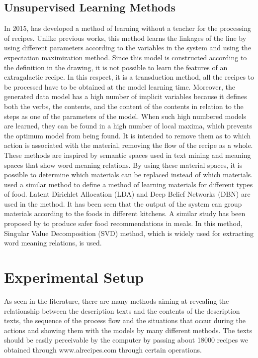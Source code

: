 \subsection{Unsupervised Learning Methods}
In 2015, \cite{kiddon2015mise} has developed a method of learning without a teacher for the processing of recipes. Unlike previous works, this method learns the linkages of the line by using different parameters according to the variables in the system and using the expectation maximization method. Since this model is constructed according to the definition in the drawing, it is not possible to learn the features of an extragalactic recipe. In this respect, it is a transduction method, all the recipes to be processed have to be obtained at the model learning time. Moreover, the generated data model has a high number of implicit variables because it defines both the verbs, the contents, and the content of the contents in relation to the steps as one of the parameters of the model. When such high numbered models are learned, they can be found in a high number of local maxima, which prevents the optimum model from being found.
It is intended to remove them as to which action is associated with the material, removing the flow of the recipe as a whole. These methods are inspired by semantic spaces used in text mining and meaning spaces that show word meaning relations. By using these material spaces, it is possible to determine which materials can be replaced instead of which materials. \cite{nedovic2013learning} used a similar method to define a method of learning materials for different types of food. Latent Dirichlet Allocation (LDA) and Deep Belief Networks (DBN) are used in the method. It has been seen that the output of the system can group materials according to the foods in different kitchens. A similar study has been proposed by \cite{achananuparp2016extracting} to produce safer food recommendations in meals. In this method, Singular Value Decomposition (SVD) method, which is widely used for extracting word meaning relations, is used.

\section{Experimental Setup}
As seen in the literature, there are many methods aiming at revealing the relationship between the description texts and the contents of the description texts, the sequence of the process flow and the situations that occur during the actions and showing them with the models by many different methods. The texts should be easily perceivable by the computer by passing about 18000 recipes we obtained through www.alrecipes.com through certain operations.

